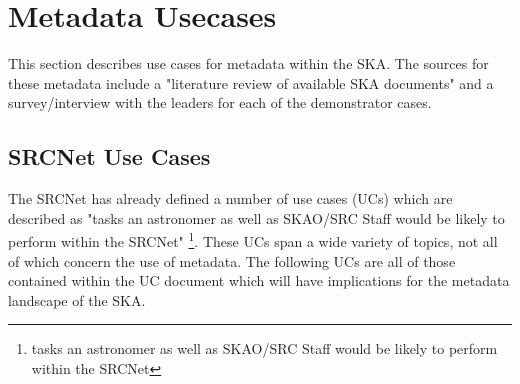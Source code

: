 \section{Metadata Usecases}\label{sec:reqs}

This section describes use cases for metadata within the SKA.
The sources for these metadata include a "literature review of available SKA documents" and a survey/interview with the leaders for each of the demonstrator cases. 

\subsection{SRCNet Use Cases}

The SRCNet has already defined a number of use cases (UCs) which are described as "tasks an astronomer as well as SKAO/SRC Staff would be likely to perform within the
SRCNet" \footnote{tasks an astronomer as well as SKAO/SRC Staff would be likely to perform within the SRCNet}. 
These UCs span a wide variety of topics, not all of which concern the use of metadata.
The following UCs are all of those contained within the UC document which will have implications for the metadata landscape of the SKA. 
\\

